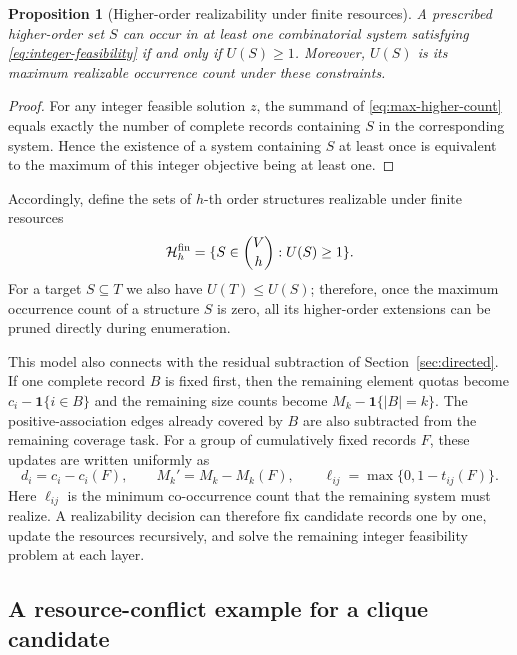 \documentclass[11pt,a4paper]{article}
\numberwithin{equation}{section}
\newtheorem{proposition}{Proposition}[section]
\theoremstyle{definition}
\numberwithin{algorithm}{section}
\begin{document}
\begin{proposition}[Higher-order realizability under finite resources]
\label{prop:finite-realizability}
A prescribed higher-order set $S$ can occur in at least one combinatorial system satisfying
\eqref{eq:integer-feasibility} if and only if $U(S)\ge1$.
Moreover, $U(S)$ is its maximum realizable occurrence count under these constraints.
\end{proposition}
\begin{proof}
For any integer feasible solution $z$, the summand of \eqref{eq:max-higher-count} equals
exactly the number of complete records containing $S$ in the corresponding system.
Hence the existence of a system containing $S$ at least once is equivalent to the maximum of
this integer objective being at least one.
\end{proof}

Accordingly, define the sets of $h$-th order structures realizable under finite resources
\begin{equation}
\mathcal H_h^{\rm fin}
=\{S\in\binom Vh:U(S)\ge1\}.
\label{eq:finite-family}
\end{equation}
For a target $S\subseteq T$ we also have $U(T)\le U(S)$;
therefore, once the maximum occurrence count of a structure $S$ is zero, all its
higher-order extensions can be pruned directly during enumeration.

This model also connects with the residual subtraction of Section~\ref{sec:directed}.
If one complete record $B$ is fixed first, then the remaining element quotas become
$c_i-\mathbf1\{i\in B\}$ and the remaining size counts become
$M_k-\mathbf1\{|B|=k\}$.
The positive-association edges already covered by $B$ are also subtracted from the remaining
coverage task.
For a group of cumulatively fixed records $F$, these updates are written uniformly as
\begin{equation}
d_i=c_i-c_i(F),\qquad
M_k'=M_k-M_k(F),\qquad
\ell_{ij}=\max\{0,1-t_{ij}(F)\}.
\label{eq:feas-residual}
\end{equation}
Here $\ell_{ij}$ is the minimum co-occurrence count that the remaining system must realize.
A realizability decision can therefore fix candidate records one by one, update the resources
recursively, and solve the remaining integer feasibility problem at each layer.

\subsection{A resource-conflict example for a clique candidate}\label{subsec:boundary-counterexample}
\end{document}

